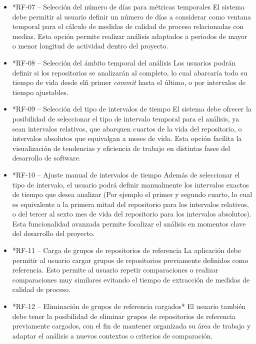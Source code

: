 \begin{itemize}
    \item*{RF-07 – Selección del número de días para métricas temporales}
    El sistema debe permitir al usuario definir un número de días a considerar como ventana temporal para el cálculo de medidas de calidad de proceso relacionadas con medias. Esta opción permite realizar análisis adaptados a periodos de mayor o menor longitud de actividad dentro del proyecto.
    
    \item*{RF-08 – Selección del ámbito temporal del análisis}
    Los usuarios podrán definir si los repositorios se analizarán al completo, lo cual abarcaría todo su tiempo de vida desde elñ primer \textit{commit} hasta el último, o por intervalos de tiempo ajustables.
    
    \item*{RF-09 – Selección del tipo de intervalos de tiempo}
    El sistema debe ofrecer la posibilidad de seleccionar el tipo de intervalo temporal para el análisis, ya sean intervalos relativos, que abarquen cuartos de la vida del repositorio, o intervalos absolutos que equivalgan a meses de vida. Esta opción facilita la visualización de tendencias y eficiencia de trabajo en distintas fases del desarrollo de software.
    
    \item*{RF-10 – Ajuste manual de intervalos de tiempo}
    Además de seleccionar el tipo de intervalo, el usuario podrá definir manualmente los intervalos exactos de tiempo que desea analizar (Por ejemplo el primer y segundo cuarto, lo cual es equivalente a la primera mitad del repositorio para los intervalos relativos, o del tercer al sexto mes de vida del repositorio para los intervalos absolutos). Esta funcionalidad avanzada permite focalizar el análisis en momentos clave del desarrollo del proyecto.
    
    \item*{RF-11 – Carga de grupos de repositorios de referencia}
    La aplicación debe permitir al usuario cargar grupos de repositorios previamente definidos como referencia. Esto permite al usuario repetir comparaciones o realizar comparaciones muy similares evitando el tiempo de extracción de medidas de calidad de proceso.
    
    \item*{RF-12 – Eliminación de grupos de referencia cargados*}
    El usuario también debe tener la posibilidad de eliminar grupos de repositorios de referencia previamente cargados, con el fin de mantener organizada su área de trabajo y adaptar el análisis a nuevos contextos o criterios de comparación.
    

\end{itemize}
